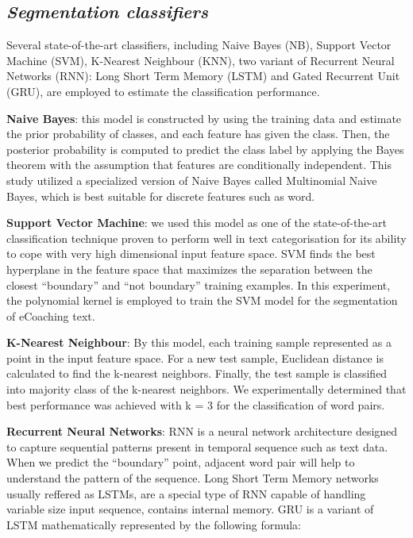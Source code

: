 \documentclass{amia}
\begin{document}
\subsection*{\textit{Segmentation classifiers}}
Several state-of-the-art classifiers, including Naive Bayes (NB)\cite{pedregosa2011scikit}, Support Vector Machine (SVM)\cite{chang2011libsvm}, K-Nearest Neighbour (KNN)\cite{pedregosa2011scikit}, two variant of Recurrent Neural Networks (RNN)\cite{bengio1993problem}: Long Short Term Memory (LSTM)\cite{hochreiter1997long} and Gated Recurrent Unit (GRU)\cite{cho2014properties}, are employed to estimate the classification performance. 

\textbf{Naive Bayes}: this model is constructed by using the training data and estimate the prior probability of classes, and each feature has given the class. Then, the posterior probability is computed to predict the class label by applying the Bayes theorem with the assumption that features are conditionally independent. This study utilized a specialized version of Naive Bayes called Multinomial Naive Bayes, which is best suitable for discrete features such as word.

\textbf{Support Vector Machine}: we used this model as one of the state-of-the-art classification technique proven to perform well in text categorisation\cite{joachims1998text} for its ability to cope with very high dimensional input feature space. SVM finds the best hyperplane in the feature space that maximizes the separation between the closest ``boundary'' and ``not boundary'' training examples. In this experiment, the polynomial kernel is employed to train the SVM model for the segmentation of eCoaching text.   

\textbf{K-Nearest Neighbour}: By this model, each training sample represented as a point in the input feature space. For a new test sample, Euclidean distance is calculated to find the k-nearest neighbors. Finally, the test sample is classified into majority class of the k-nearest neighbors. We experimentally determined that best performance was achieved with k = 3 for the classification of word pairs. 

\textbf{Recurrent Neural Networks}: RNN is a neural network architecture designed to capture sequential patterns present in temporal sequence such as text data. When we predict the ``boundary'' point, adjacent word pair will help to understand the pattern of the sequence. Long Short Term Memory networks usually reffered as LSTMs\cite{hochreiter1997long}, are a special type of RNN capable of handling variable size input sequence, contains internal memory. GRU\cite{cho2014properties} is a variant of LSTM mathematically represented by the following formula:
\end{document}
